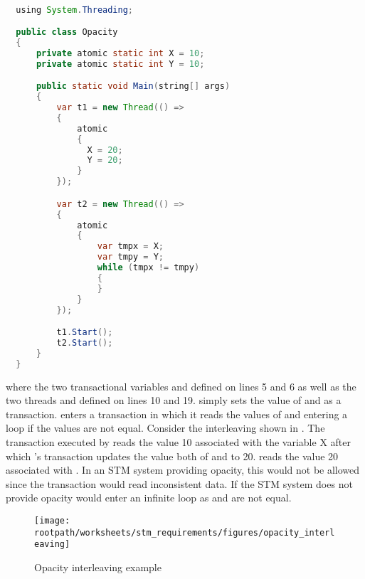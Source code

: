 \begin{lstlisting}[label=lst:stm_opacity,
  caption={Opacity example},
  language=Java,  
  showspaces=false,
  showtabs=false,
  breaklines=true,
  showstringspaces=false,
  breakatwhitespace=true,
  commentstyle=\color{greencomments},
  keywordstyle=\color{bluekeywords},
  stringstyle=\color{redstrings},
  morekeywords={atomic, retry, orelse, var, get, set, using}]  % Start your code-block

  using System.Threading;

  public class Opacity
  {
      private atomic static int X = 10;
      private atomic static int Y = 10;

      public static void Main(string[] args)
      {
          var t1 = new Thread(() =>
          {
              atomic
              {
                X = 20;
                Y = 20;
              }
          });

          var t2 = new Thread(() =>
          {
              atomic
              {
                  var tmpx = X;
                  var tmpy = Y;
                  while (tmpx != tmpy)
                  {
                  }
              }
          });

          t1.Start();
          t2.Start();
      }
  }
\end{lstlisting}
where the two transactional variables  and  defined on lines 5 and 6 as well as the two threads  and  defined on lines 10 and 19.  simply sets the value of  and  as a transaction.  enters a transaction in which it reads the values of  and  entering a loop if the values are not equal. Consider the interleaving shown in . The transaction executed by  reads the value 10 associated with the variable X after which 's transaction updates the value both of  and  to 20.  reads the value 20 associated with . In an \ac{STM} system providing opacity, this would not be allowed since the transaction would read inconsistent data. If the \ac{STM} system does not provide opacity  would enter an infinite loop as  and  are not equal. 

\begin{figure}[htbp]
\centering
 \texttt{[image: \\rootpath/worksheets/stm\_requirements/figures/opacity\_interleaving]} 
 \caption{Opacity interleaving example}
\label{fig:opacity_interleaving}
\end{figure}

